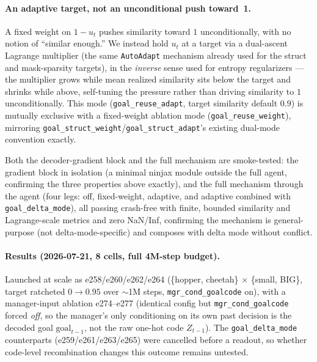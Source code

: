\documentclass[10pt]{article}
\begin{document}
\paragraph{An adaptive target, not an unconditional push toward~1.} A fixed
weight on $1 - u_t$ pushes similarity toward $1$ unconditionally, with no
notion of ``similar enough.'' We instead hold $u_t$ at a target via a
dual-ascent Lagrange multiplier (the same \texttt{AutoAdapt} mechanism
already used for the struct and mask-sparsity targets), in the
\emph{inverse} sense used for entropy regularizers --- the multiplier grows
while mean realized similarity sits below the target and shrinks while
above, self-tuning the pressure rather than driving similarity to $1$
unconditionally. This mode (\texttt{goal\_reuse\_adapt}, target similarity
default $0.9$) is mutually exclusive with a fixed-weight ablation mode
(\texttt{goal\_reuse\_weight}), mirroring
\texttt{goal\_struct\_weight}/\texttt{goal\_struct\_adapt}'s existing
dual-mode convention exactly.

Both the decoder-gradient block and the full mechanism are smoke-tested:
the gradient block in isolation (a minimal ninjax module outside the full
agent, confirming the three properties above exactly), and the full
mechanism through the agent (four legs: off, fixed-weight, adaptive, and
adaptive combined with \texttt{goal\_delta\_mode}), all passing crash-free
with finite, bounded similarity and Lagrange-scale metrics and zero NaN/Inf,
confirming the mechanism is general-purpose (not delta-mode-specific) and
composes with delta mode without conflict.

\paragraph{Results (2026-07-21, 8 cells, full 4M-step budget).} Launched at
scale as e258/e260/e262/e264 (\{hopper, cheetah\} $\times$ \{small, BIG\},
target ratcheted $0{\to}0.95$ over $\sim$1M steps, \texttt{mgr\_cond\_goalcode}
on), with a manager-input ablation e274--e277 (identical config but
\texttt{mgr\_cond\_goalcode} forced \emph{off}, so the manager's only
conditioning on its own past decision is the decoded goal
$\text{goal}_{t-1}$, not the raw one-hot code $Z_{t-1}$). The
\texttt{goal\_delta\_mode} counterparts (e259/e261/e263/e265) were cancelled
before a readout, so whether code-level recombination changes this outcome
remains untested.
\end{document}
